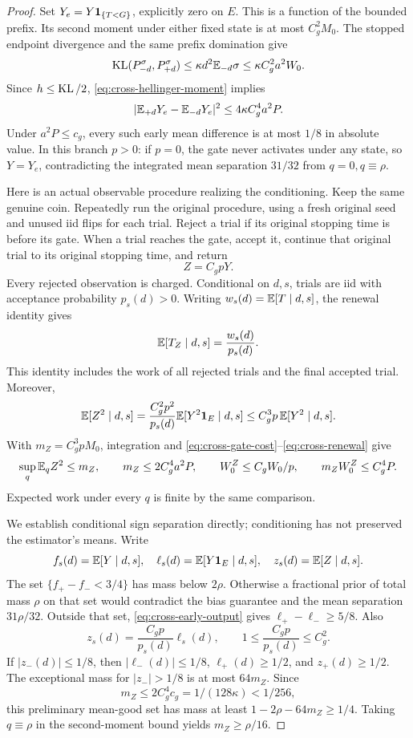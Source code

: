 \begin{proof}
Set \(Y_e=Y\mathbf 1_{\{T<G\}}\), explicitly zero on \(E\).
This is a function of the bounded prefix.
Its second moment under either fixed state is at most \(C_g^2M_0\).
The stopped endpoint divergence and the same prefix domination give
\[
 \operatorname{KL}(P_{-d}^{\sigma},P_{+d}^{\sigma})
 \le\kappa d^2\mathbb E_{-d}\sigma
 \le\kappa C_g^2a^2W_0.
\]
Since \(h\le\operatorname{KL}/2\), \eqref{eq:cross-hellinger-moment} implies
\begin{equation}
 |\mathbb E_{+d}Y_e-\mathbb E_{-d}Y_e|^2
 \le4\kappa C_g^4a^2P.
 \label{eq:cross-early-output}
\end{equation}
Under \(a^2P\le c_g\), every such early mean difference is at most
\(1/8\) in absolute value.  In this branch \(p>0\): if \(p=0\), the
gate never activates under any state, so \(Y=Y_e\), contradicting
the integrated mean separation \(31/32\) from \(q=0,q\equiv\rho\).

Here is an actual observable procedure realizing the conditioning.
Keep the same genuine coin.  Repeatedly run the original procedure,
using a fresh original seed and unused iid flips for each trial.
Reject a trial if its original stopping time is before its gate.
When a trial reaches the gate, accept it, continue that original trial
to its original stopping time, and return
\[
 Z=C_gpY.
\]
Every rejected observation is charged.  Conditional on \(d,s\), trials
are iid with acceptance probability \(p_s(d)>0\).
Writing \(w_s(d)=\mathbb E[T\mid d,s]\), the renewal identity gives
\begin{equation}
 \mathbb E[T_Z\mid d,s]=\frac{w_s(d)}{p_s(d)}.
 \label{eq:cross-renewal}
\end{equation}
This identity includes the work of all rejected trials and the final
accepted trial.  Moreover,
\[
 \mathbb E[Z^2\mid d,s]
 =\frac{C_g^2p^2}{p_s(d)}\mathbb E[Y^2\mathbf 1_E\mid d,s]
 \le C_g^3p\,\mathbb E[Y^2\mid d,s].
\]
With \(m_Z=C_g^3pM_0\), integration and
\eqref{eq:cross-gate-cost}--\eqref{eq:cross-renewal} give
\begin{equation}
 \sup_q\mathbb E_qZ^2\le m_Z,\qquad
 m_Z\le2C_g^4a^2P,\qquad
 W_0^Z\le C_gW_0/p,\qquad
 m_ZW_0^Z\le C_g^4P.
 \label{eq:cross-gate-moments}
\end{equation}
Expected work under every \(q\) is finite by the same comparison.

We establish conditional sign separation directly; conditioning has
not preserved the estimator's means.  Write
\[
 f_s(d)=\mathbb E[Y\mid d,s],\quad
 \ell_s(d)=\mathbb E[Y\mathbf 1_E\mid d,s],\quad
 z_s(d)=\mathbb E[Z\mid d,s].
\]
The set \(\{f_+-f_-<3/4\}\) has mass below \(2\rho\).
Otherwise a fractional prior of total mass \(\rho\) on that set would
contradict the bias guarantee and the mean separation \(31\rho/32\).
Outside that set, \eqref{eq:cross-early-output} gives
\(\ell_+-\ell_-\ge5/8\).
Also
\[
 z_s(d)=\frac{C_gp}{p_s(d)}\ell_s(d),\qquad
 1\le\frac{C_gp}{p_s(d)}\le C_g^2.
\]
If \(|z_-(d)|\le1/8\), then \(|\ell_-(d)|\le1/8\),
\(\ell_+(d)\ge1/2\), and \(z_+(d)\ge1/2\).
The exceptional mass for \(|z_-|>1/8\) is at most \(64m_Z\).
Since
\[
 m_Z\le2C_g^4c_g=1/(128\kappa)<1/256,
\]
this preliminary mean-good set has mass at least
\(1-2\rho-64m_Z\ge1/4\).
Taking \(q\equiv\rho\) in the second-moment bound yields
\(m_Z\ge\rho/16\).


\end{proof}
